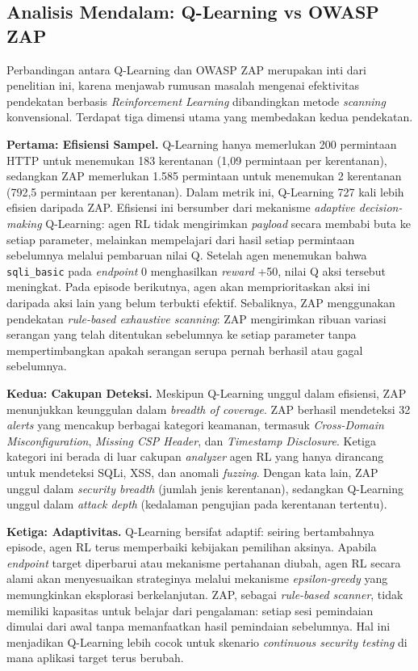 \subsection{Analisis Mendalam: Q-Learning vs OWASP ZAP}

Perbandingan antara Q-Learning dan OWASP ZAP merupakan inti dari penelitian ini, karena menjawab rumusan masalah mengenai efektivitas pendekatan berbasis \textit{Reinforcement Learning} dibandingkan metode \textit{scanning} konvensional. Terdapat tiga dimensi utama yang membedakan kedua pendekatan.

\textbf{Pertama: Efisiensi Sampel.} Q-Learning hanya memerlukan 200 permintaan HTTP untuk menemukan 183 kerentanan (1,09 permintaan per kerentanan), sedangkan ZAP memerlukan 1.585 permintaan untuk menemukan 2 kerentanan (792,5 permintaan per kerentanan). Dalam metrik ini, Q-Learning 727 kali lebih efisien daripada ZAP. Efisiensi ini bersumber dari mekanisme \textit{adaptive decision-making} Q-Learning: agen RL tidak mengirimkan \textit{payload} secara membabi buta ke setiap parameter, melainkan mempelajari dari hasil setiap permintaan sebelumnya melalui pembaruan nilai Q. Setelah agen menemukan bahwa \texttt{sqli\_basic} pada \textit{endpoint} 0 menghasilkan \textit{reward} +50, nilai Q aksi tersebut meningkat. Pada episode berikutnya, agen akan memprioritaskan aksi ini daripada aksi lain yang belum terbukti efektif. Sebaliknya, ZAP menggunakan pendekatan \textit{rule-based exhaustive scanning}: ZAP mengirimkan ribuan variasi serangan yang telah ditentukan sebelumnya ke setiap parameter tanpa mempertimbangkan apakah serangan serupa pernah berhasil atau gagal sebelumnya.

\textbf{Kedua: Cakupan Deteksi.} Meskipun Q-Learning unggul dalam efisiensi, ZAP menunjukkan keunggulan dalam \textit{breadth of coverage}. ZAP berhasil mendeteksi 32 \textit{alerts} yang mencakup berbagai kategori keamanan, termasuk \textit{Cross-Domain Misconfiguration}, \textit{Missing CSP Header}, dan \textit{Timestamp Disclosure}. Ketiga kategori ini berada di luar cakupan \textit{analyzer} agen RL yang hanya dirancang untuk mendeteksi SQLi, XSS, dan anomali \textit{fuzzing}. Dengan kata lain, ZAP unggul dalam \textit{security breadth} (jumlah jenis kerentanan), sedangkan Q-Learning unggul dalam \textit{attack depth} (kedalaman pengujian pada kerentanan tertentu).

\textbf{Ketiga: Adaptivitas.} Q-Learning bersifat adaptif: seiring bertambahnya episode, agen RL terus memperbaiki kebijakan pemilihan aksinya. Apabila \textit{endpoint} target diperbarui atau mekanisme pertahanan diubah, agen RL secara alami akan menyesuaikan strateginya melalui mekanisme \textit{epsilon-greedy} yang memungkinkan eksplorasi berkelanjutan. ZAP, sebagai \textit{rule-based scanner}, tidak memiliki kapasitas untuk belajar dari pengalaman: setiap sesi pemindaian dimulai dari awal tanpa memanfaatkan hasil pemindaian sebelumnya. Hal ini menjadikan Q-Learning lebih cocok untuk skenario \textit{continuous security testing} di mana aplikasi target terus berubah.

